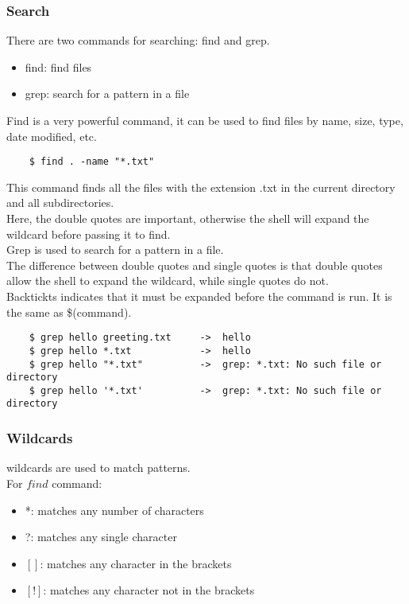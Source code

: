 \documentclass[12pt,a4paper]{article}
\begin{document}
\subsubsection{Search}
There are two commands for searching: find and grep.\\
\begin{itemize}
    \item find: find files
    \item grep: search for a pattern in a file
\end{itemize}
Find is a very powerful command, it can be used to find files by name, size, type, date modified, etc.\\
\begin{lstlisting}
    $ find . -name "*.txt"
\end{lstlisting}
This command finds all the files with the extension .txt in the current directory and all subdirectories.\\
Here, the double quotes are important, otherwise the shell will expand the wildcard before passing it to find.\\
Grep is used to search for a pattern in a file.\\
The difference between double quotes and single quotes is that double quotes allow the shell to expand the wildcard, while single quotes do not.\\ 
Backtickts indicates that it must be expanded before the command is run. It is the same as \$(command).\\
\begin{lstlisting}
    $ grep hello greeting.txt     ->  hello
    $ grep hello *.txt            ->  hello
    $ grep hello "*.txt"          ->  grep: *.txt: No such file or directory 
    $ grep hello '*.txt'          ->  grep: *.txt: No such file or directory 
\end{lstlisting}

\subsubsection{Wildcards}  
wildcards are used to match patterns.\\
For $find$ command:
\begin{itemize}
    \item *: matches any number of characters
    \item ?: matches any single character
    \item $[]$: matches any character in the brackets
    \item $[!]$: matches any character not in the brackets
\end{itemize}
\end{document}
